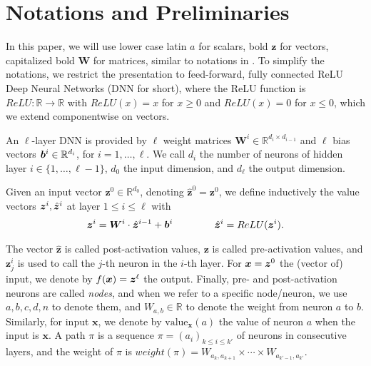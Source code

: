 \documentclass{llncs}
\newcommand{\val}{{\textrm{value}}}
\begin{document}

%


\section{Notations and Preliminaries}

In this paper, we will use lower case latin $a$ for scalars, bold $\boldsymbol{z}$ for vectors, 
capitalized bold $\boldsymbol{W}$ for matrices, similar to notations in \textcolor{blue}{\cite{crown}}.
To simplify the notations, we restrict the presentation to feed-forward, 
fully connected ReLU Deep Neural Networks (DNN for short), where the ReLU function is $ReLU : \mathbb{R} \rightarrow \mathbb{R}$ with
$ReLU(x)=x$ for $x \geq 0$ and $ReLU(x)=0$ for $x \leq 0$, which we extend componentwise on vectors.




An $\ell$-layer DNN is provided by $\ell$ weight matrices 
$\boldsymbol{W}^i \in \mathbb{R}^{d_i\times d_{i-1}}$
and $\ell$ bias vectors ${\bm{b}}^i \in \mathbb{R}^{d_i}$, for $i=1, \ldots, \ell$.
We call $d_i$ the number of neurons of hidden layer $i \in \{1, \ldots, \ell-1\}$,
$d_0$ the input dimension, and $d_\ell$ the output dimension.

Given an input vector $\boldsymbol{z}^0 \in \mathbb{R}^{d_0}$, 
denoting $\hat{\boldsymbol{z}}^{0}={\boldsymbol{z}}^0$, we define inductively the value vectors $\boldsymbol{z}^i,\hat{{\bm{z}}}^i$ at layer $1 \leq i \leq \ell$ with
\begin{align*}
	\boldsymbol{z}^{i} = \boldsymbol{W}^i\cdot \hat{\boldsymbol{z}}^{i-1}+ {\bm{b}}^i \qquad \, \qquad
	\hat{\boldsymbol{z}}^{i} = ReLU({\boldsymbol{z}}^i).
\end{align*} 

The vector $\hat{\boldsymbol{z}}$ is called post-activation values, 
$\boldsymbol{z}$ is called pre-activation values, 
and $\boldsymbol{z}^{i}_j$ is used to call the $j$-th neuron in the $i$-th layer. 
For $\boldsymbol{x}={\bm{z}}^0$ the (vector of) input, we denote by $f(\boldsymbol{x})={\bm{z}}^\ell$ the output. Finally, pre- and post-activation neurons are called \emph{nodes}, and when we refer to a specific node/neuron, we use $a,b,c,d,n$ to denote them, and $W_{a,b} \in \mathbb{R}$ to denote the weight from neuron $a$ to $b$. Similarly, for input $\boldsymbol{x}$, we denote by $\val_{\boldsymbol{x}}(a)$ the value of neuron $a$ when the input is $\boldsymbol{x}$. A path $\pi$ is a sequence $\pi=(a_i)_{k \leq  i \leq k'}$ of neurons in consecutive layers, and the weight of $\pi$ is 
$weight(\pi)=W_{a_k,a_{k+1}} \times \cdots \times  W_{a_{k'-1},a_{k'}}$.
\end{document}
